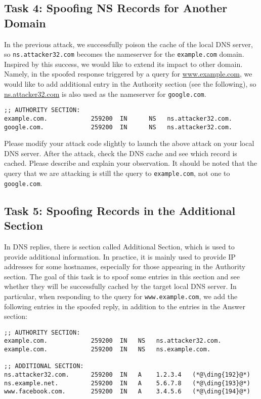 \subsection{Task 4: Spoofing NS Records for Another Domain} 

In the previous attack, we successfully poison the cache of the local DNS
server, so \texttt{ns.attacker32.com} becomes the nameserver for the 
\texttt{example.com} domain. Inspired by this success, we would like to 
extend its impact to other domain. Namely, 
in the spoofed response triggered by a query for
\url{www.example.com}, we would like to add additional entry
in the Authority section (see the following), so
\url{ns.attacker32.com} is also used as the nameserver for 
\texttt{google.com}.  


\begin{lstlisting}
;; AUTHORITY SECTION:
example.com.            259200  IN      NS   ns.attacker32.com.
google.com.             259200  IN      NS   ns.attacker32.com.
\end{lstlisting}

Please modify your attack code slightly to launch 
the above attack on your local DNS server. After the 
attack, check the DNS cache and see which record is cached.
Please describe and explain your observation. It should be noted that the query
that we are attacking is still the query to \texttt{example.com}, not one
to \texttt{google.com}.  


\subsection{Task 5: Spoofing Records in the Additional Section}

In DNS replies, there is section called Additional Section, which is used
to provide additional information. In practice, it is mainly used to
provide IP addresses for some hostnames, especially for those appearing in the
Authority section. The goal of this task is to spoof some entries 
in this section and see whether they will be successfully cached by the
target local DNS server. In particular, when responding to 
the query for \texttt{www.example.com}, we add the following entries 
in the spoofed reply, in addition to the entries in the Answer section:


\begin{lstlisting}
;; AUTHORITY SECTION:
example.com.            259200  IN   NS   ns.attacker32.com.
example.com.            259200  IN   NS   ns.example.com.

;; ADDITIONAL SECTION:
ns.attacker32.com.      259200  IN   A    1.2.3.4   (*@\ding{192}@*)
ns.example.net.         259200  IN   A    5.6.7.8   (*@\ding{193}@*)
www.facebook.com.       259200  IN   A    3.4.5.6   (*@\ding{194}@*)
\end{lstlisting}

